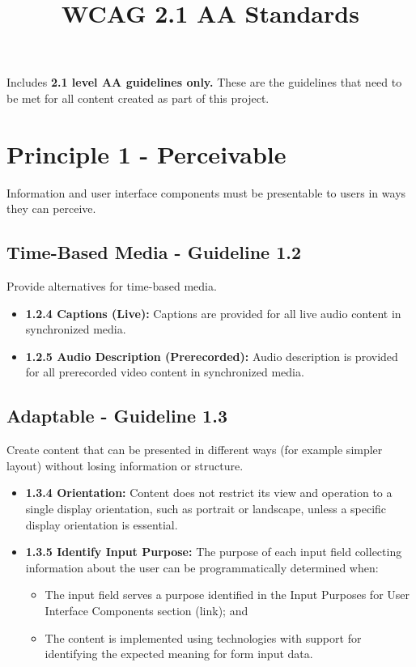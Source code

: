 \documentclass[
  letterpaper,
  DIV=11,
  numbers=noendperiod]{scrartcl}
\title{WCAG 2.1 AA Standards}
\author{}
\date{}
\providecommand{\tightlist}{%
  \setlength{\itemsep}{0pt}\setlength{\parskip}{0pt}}\usepackage{longtable,booktabs,array}
\begin{document}
\maketitle


Includes \textbf{2.1 level AA guidelines only.} These are the guidelines
that need to be met for all content created as part of this project.

\section{Principle 1 - Perceivable}\label{principle-1---perceivable}

Information and user interface components must be presentable to users
in ways they can perceive.

\subsection{Time-Based Media - Guideline
1.2}\label{time-based-media---guideline-1.2}

Provide alternatives for time-based media.

\begin{itemize}
\item
  \textbf{1.2.4 Captions (Live):} Captions are provided for all live
  audio content in synchronized media.
\item
  \textbf{1.2.5 Audio Description (Prerecorded):} Audio description is
  provided for all prerecorded video content in synchronized media.
\end{itemize}

\subsection{Adaptable - Guideline 1.3}\label{adaptable---guideline-1.3}

Create content that can be presented in different ways (for example
simpler layout) without losing information or structure.

\begin{itemize}
\item
  \textbf{1.3.4 Orientation:} Content does not restrict its view and
  operation to a single display orientation, such as portrait or
  landscape, unless a specific display orientation is essential.
\item
  \textbf{1.3.5 Identify Input Purpose:} The purpose of each input field
  collecting information about the user can be programmatically
  determined when:

  \begin{itemize}
  \tightlist
  \item
    The input field serves a purpose identified in the Input Purposes
    for User Interface Components section (link); and
  \item
    The content is implemented using technologies with support for
    identifying the expected meaning for form input data.
  \end{itemize}
\end{itemize}
\end{document}
